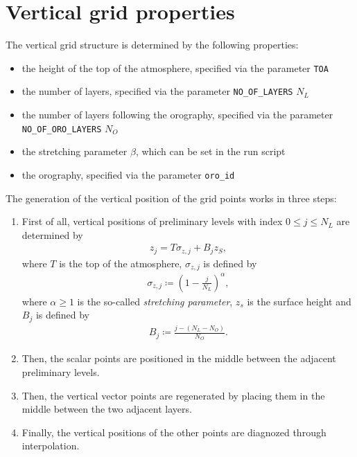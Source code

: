 \documentclass[10pt]{report}
\begin{document}
\section{Vertical grid properties}
\label{sec:vertical_grid_properties}

The vertical grid structure is determined by the following properties:

\begin{itemize}
\item the height of the top of the atmosphere, specified via the parameter \texttt{TOA}
\item the number of layers, specified via the parameter \texttt{NO\_OF\_LAYERS} $N_L$
\item the number of layers following the orography, specified via the parameter \texttt{NO\_OF\_ORO\_LAYERS} $N_O$
\item the stretching parameter $\beta$, which can be set in the run script
\item the orography, specified via the parameter \texttt{oro\_id}
\end{itemize}

The generation of the vertical position of the grid points works in three steps:
%
\begin{enumerate}
\item First of all, vertical positions of preliminary levels with index $0 \leq j \leq N_L$ are determined by
%
\begin{align}
z_j = T\sigma_{z, j} + B_jz_S,
\end{align}
%
where $T$ is the top of the atmosphere, $\sigma_{z, j}$ is defined by
%
\begin{align}
\sigma_{z, j} \coloneqq \left(1 - \frac{j}{N_L}\right)^\alpha,
\end{align}
%
where $\alpha \geq 1$ is the so-called \textit{stretching parameter}, $z_s$ is the surface height and $B_j$ is defined by
%
\begin{align}
B_j \coloneqq \frac{j - \left(N_L - N_O\right)}{N_O}.
\end{align}
%
\item Then, the scalar points are positioned in the middle between the adjacent preliminary levels.
\item Then, the vertical vector points are regenerated by placing them in the middle between the two adjacent layers.
\item Finally, the vertical positions of the other points are diagnozed through interpolation.
\end{enumerate}
\end{document}

